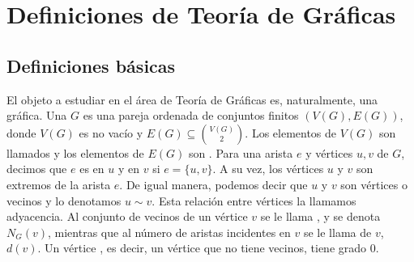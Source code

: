 \chapter{Definiciones de Teor\'ia de Gr\'aficas}%
\label{cap:defs grafs}

\section{Definiciones b\'asicas}%
\label{sec:def-basicas}

El objeto a estudiar en el \'area de Teor\'ia de Gr\'aficas es, naturalmente,
una gr\'afica. Una  $G$ es una pareja ordenada de conjuntos
finitos $(V(G), E(G))$, donde $V(G)$ es no vac\'io y $E(G) \subseteq
\binom{V(G)}{2}$. Los elementos de $V(G)$ son llamados  y los
elementos de $E(G)$ son . Para una arista $e$ y v\'ertices $u,
v$ de $G$, decimos que $e$ es  en $u$ y en $v$ si
$e= \{u, v\}$. A su vez, los v\'ertices $u$ y $v$ son extremos de la arista $e$.
De igual manera, podemos decir que $u$ y $v$ son v\'ertices 
o vecinos y lo denotamos $u \sim v$. Esta relaci\'on entre v\'ertices la
llamamos adyacencia. Al conjunto de vecinos de un v\'ertice $v$ se le llama
, y se denota $N_G(v)$, mientras que al n\'umero de aristas
incidentes en $v$ se le llama  de $v$, $d(v)$. Un v\'ertice
, es decir, un v\'ertice que no tiene vecinos, tiene grado $0$.

